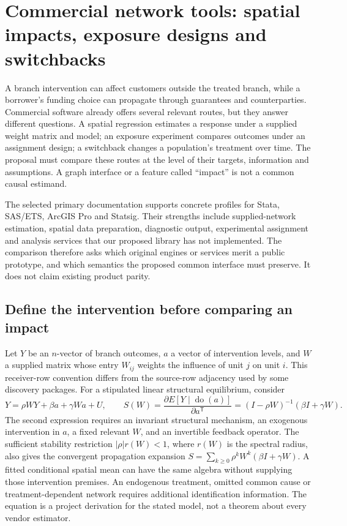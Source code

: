 \section{Commercial network tools: spatial impacts, exposure designs and switchbacks}
\label{exec20:network-scope}

A branch intervention can affect customers outside the treated branch, while a
borrower's funding choice can propagate through guarantees and counterparties.
Commercial software already offers several relevant routes, but they answer
different questions. A spatial regression estimates a response under a supplied
weight matrix and model; an exposure experiment compares outcomes under an
assignment design; a switchback changes a population's treatment over time.
The proposal must compare these routes at the level of their targets, information
and assumptions. A graph interface or a feature called ``impact'' is not a
common causal estimand.

The selected primary documentation supports concrete profiles for Stata,
SAS/ETS, ArcGIS Pro and Statsig. Their strengths include supplied-network
estimation, spatial data preparation, diagnostic output, experimental assignment
and analysis services that our proposed library has not implemented. The
comparison therefore asks which original engines or services merit a public
prototype, and which semantics the proposed common interface must preserve.
It does not claim existing product parity.
\citep{exec20_network_stata_spregress,exec20_network_sas_latest_spatial,
exec20_network_arcgis_tool,exec20_network_statsig_types}

\subsection{Define the intervention before comparing an impact}
\label{exec20:network-target}

Let $Y$ be an $n$-vector of branch outcomes, $a$ a vector of intervention levels,
and $W$ a supplied matrix whose entry $W_{ij}$ weights the influence of unit $j$
on unit $i$. This receiver-row convention differs from the source-row adjacency
used by some discovery packages. For a stipulated linear structural equilibrium,
consider
\begin{equation}
 Y=\rho WY+\beta a+\gamma Wa+U,
 \qquad
 S(W)=\frac{\partial E[Y\mid\operatorname{do}(a)]}{\partial a^{\mathsf T}}
      =(I-\rho W)^{-1}(\beta I+\gamma W).
 \label{exec20:network-response}
\end{equation}
The second expression requires an invariant structural mechanism, an exogenous
intervention in $a$, a fixed relevant $W$, and an invertible feedback operator.
The sufficient stability restriction $|\rho|r(W)<1$, where $r(W)$ is the
spectral radius, also gives the convergent propagation expansion
$S=\sum_{k\geq0}\rho^kW^k(\beta I+\gamma W)$. A fitted conditional spatial
mean can have the same algebra without supplying those intervention premises.
An endogenous treatment, omitted common cause or treatment-dependent network
requires additional identification information. The equation is a project
derivation for the stated model, not a theorem about every vendor estimator.
\citep{exec20_network_reference}

